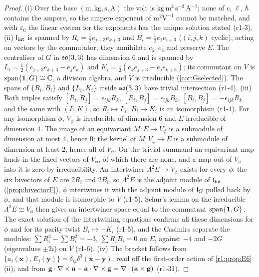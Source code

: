 \begin{proof}
(i) Over the base $(\mathrm m,\mathrm{kg},\mathrm s,\mathrm A)$ the volt is $\mathrm{kg\,m^2\,s^{-3}\,A^{-1}}$; none of $c$, $\ell$,
$\hbar$ contains the ampere, so the ampere exponent of $\mathrm{m^2V^{-1}}$ cannot be matched, and with $\varepsilon_0$ the linear system
for the exponents has the unique solution stated (r1-3). (ii) $\mathfrak l_{\rm int}$ is spanned by $R_i=\tfrac12e_{j+3}e_{k+3}$ and
$B_i=\tfrac12e_1e_{i+3}$ ($(i,j,k)$ cyclic), acting on vectors by the commutator; they annihilate $e_2,e_3$ and preserve $E$. The
centraliser of $G$ in $\mathfrak{so}(3,3)$ has dimension $6$ and is spanned by $L_i=\tfrac12(e_{j+3}e_{k+3}-e_je_k)$ and
$K_i=\tfrac12(e_ke_{j+3}-e_je_{k+3})$; its commutant on $V$ is $\operatorname{span}\{\mathbf 1,G\}\cong\mathbb{C}$, a division algebra, and $V$ is
irreducible (\cref{cor:Gselected}). The spans of $\{R_i,B_i\}$ and $\{L_i,K_i\}$ inside $\mathfrak{so}(3,3)$ have trivial intersection (r1-4).
(iii) Both triples satisfy $[R_i,R_j]=\epsilon_{ijk}R_k$, $[R_i,B_j]=\epsilon_{ijk}B_k$, $[B_i,B_j]=-\epsilon_{ijk}R_k$ and the same with
$(L,K)$, so $R_i\mapsto L_i$, $B_i\mapsto K_i$ is an isomorphism (r1-4). For any isomorphism $\phi$, $V_\phi$ is irreducible of dimension
$6$ and $E$ irreducible of dimension $4$. The image of an equivariant $M:E\to V_\phi$ is a submodule of dimension at most $4$, hence $0$;
the kernel of $M:V_\phi\to E$ is a submodule of dimension at least $2$, hence all of $V_\phi$. On the trivial summand an equivariant map
lands in the fixed vectors of $V_\phi$, of which there are none, and a map out of $V_\phi$ into it is zero by irreducibility. An intertwiner
$\Lambda^2E\to V_\phi$ exists for every $\phi$: the six bivectors of $E$ are $2R_i$ and $2B_i$, so $\Lambda^2E$ is the adjoint module of $\mathfrak l_{\rm int}$
(\cref{prop:bivectorF}), $\phi$ intertwines it with the adjoint module of $\mathfrak l_G$ pulled back by $\phi$, and that module is
isomorphic to $V$ (r1-5). Schur's lemma \cite{GoodmanWallach} on the irreducible $\Lambda^2E\cong V_\phi$ then gives an intertwiner space
equal to the commutant $\operatorname{span}\{\mathbf 1,G\}$.
The exact solution of the intertwining equations confirms all these dimensions for $\phi$ and for its parity twist $B_i\mapsto-K_i$ (r1-5),
and the Casimirs separate the modules: $\sum R_i^2-\sum B_i^2=-3$, $\sum R_iB_i=0$ on $E$, against $-4$ and $-2G$ (eigenvalues $\pm2i$) on
$V$ (r1-6). (iv) The bracket follows from $\{a_i(\mathbf x),E_j(\mathbf y)\}=\delta_{ij}\delta^3(\mathbf x-\mathbf y)$, read off the
first-order action of \cref{r1:prop:E6}(ii), and from $\mathbf g\cdot\nabla\times\mathbf a-\mathbf a\cdot\nabla\times\mathbf g=\nabla\cdot(\mathbf
a\times\mathbf g)$ (r1-31).
\end{proof}

